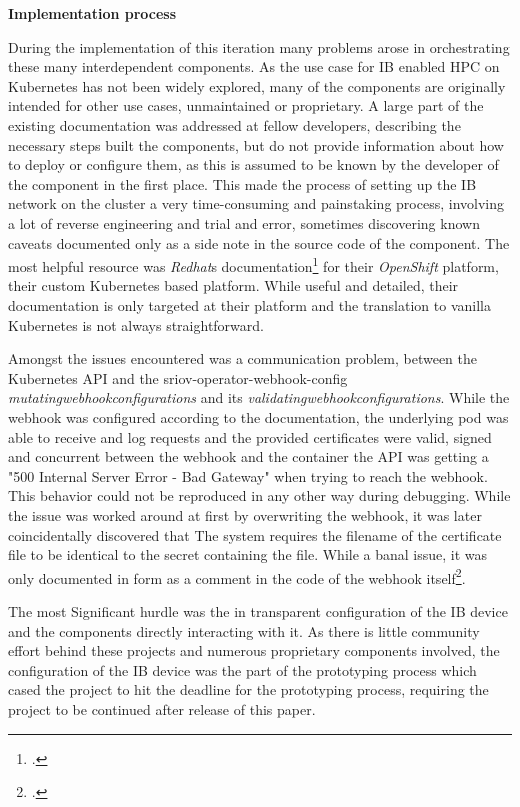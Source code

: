 \textbf{Implementation process}

During the implementation of this iteration many problems arose in orchestrating these many interdependent components.
As the use case for \ac{IB} enabled \ac{HPC} on Kubernetes has not been widely explored, many of the components
are originally intended for other use cases, unmaintained or proprietary. A large part of the existing documentation
was addressed at fellow developers, describing the necessary steps built the components, but do not
provide information about how to deploy or configure them, as this is assumed to be known by the developer of the
component in the first place. This made the process of setting up the \ac{IB} network on the cluster a very
time-consuming and painstaking process, involving a lot of reverse engineering and trial and error, sometimes
discovering known caveats documented only as a side note in the source code of the component.
The most helpful resource was \textit{Redhat}s documentation\footcite{redhat-openshiftSingleRootVirtualization} for their \textit{OpenShift} platform,
their custom Kubernetes based platform. While useful and detailed, their documentation is only targeted
at their platform and the translation to vanilla Kubernetes is not always straightforward.

Amongst the issues encountered was a communication problem, between the Kubernetes API and the
sriov-operator-webhook-config \textit{mutatingwebhookconfigurations} and its \textit{validatingwebhookconfigurations}.
While the webhook was configured according to the documentation, the underlying pod was able to receive
and log requests and the provided certificates were valid, signed and concurrent between the webhook and the container
the API was getting a "500 Internal Server Error - Bad Gateway" when trying to reach the webhook. This behavior
could not be reproduced in any other way during debugging.
While the issue was worked around at first by overwriting the webhook, it was later coincidentally discovered that
The system requires the filename of the certificate file to be identical to the secret containing the file.
While a banal issue, it was only documented in form as a comment in the code of the webhook itself\footcite{sriov-network-operator-repoSriovnetworkoperatorBindataMaster}.

The most Significant hurdle was the in transparent configuration of the \ac{IB} device and the components directly
interacting with it. As there is little community effort behind these projects and numerous proprietary
components involved, the configuration of the \ac{IB} device was the part of the prototyping process which
cased the project to hit the deadline for the prototyping process, requiring the project to be continued
after release of this paper.

